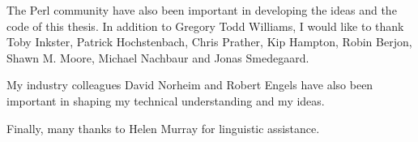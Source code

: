 The Perl community have also been important in developing the ideas
and the code of this thesis. In addition to Gregory Todd Williams, I
would like to thank Toby Inkster, Patrick Hochstenbach, Chris Prather,
Kip Hampton, Robin Berjon, Shawn M.  Moore, Michael Nachbaur and Jonas
Smedegaard.

My industry colleagues David Norheim and Robert Engels have
also been important in shaping my technical understanding and my
ideas.

Finally, many thanks to Helen Murray for linguistic assistance.
